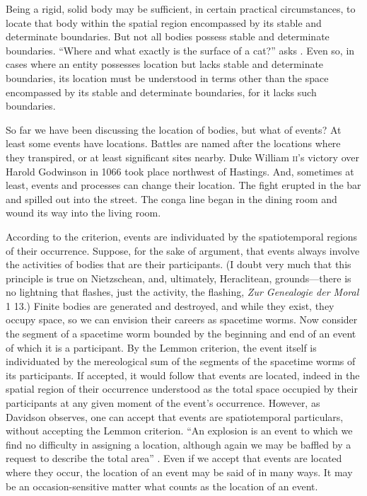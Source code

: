 Being a rigid, solid body may be sufficient, in certain practical circumstances, to locate that body within the spatial region encompassed by its stable and determinate boundaries. But not all bodies possess stable and determinate boundaries. ``Where and what exactly is the surface of a cat?'' asks \citet[lecture 9]{Austin:1962lr}. Even so, in cases where an entity possesses location but lacks stable and determinate boundaries, its location must be understood in terms other than the space encompassed by its stable and determinate boundaries, for it lacks such boundaries.

So far we have been discussing the location of bodies, but what of events? At least some events have locations. Battles are named after the locations where they transpired, or at least significant sites nearby. Duke William \textsc{ii}'s victory over Harold Godwinson in 1066 took place northwest of Hastings. And, sometimes at least, events and processes can change their location. The fight erupted in the bar and spilled out into the street. The conga line began in the dining room and wound its way into the living room.

According to the \citet{Lemmon:1967aa} criterion, events are individuated by the spatiotemporal regions of their occurrence. Suppose, for the sake of argument, that events always involve the activities of bodies that are their participants. (I doubt very much that this principle is true on Nietzschean, and, ultimately, Heraclitean, grounds---there is no lightning that flashes, just the activity, the flashing, \emph{Zur Genealogie der Moral} 1 13.) Finite bodies are generated and destroyed, and while they exist, they occupy space, so we can envision their careers as spacetime worms. Now consider the segment of a spacetime worm bounded by the beginning and end of an event of which it is a participant. By the Lemmon criterion, the event itself is individuated by the mereological sum of the segments of the spacetime worms of its participants. If accepted, it would follow that events are located, indeed in the spatial region of their occurrence understood as the total space occupied by their participants at any given moment of the event's occurrence. However, as Davidson observes, one can accept that events are spatiotemporal particulars, without accepting the Lemmon criterion. ``An explosion is an event to which we find no difficulty in assigning a location, although again we may be baffled by a request to describe the total area'' \citep[304]{Davidson:1969da}. Even if we accept that events are located where they occur, the location of an event may be said of in many ways. It may be an occasion-sensitive matter what counts as the location of an event. 

